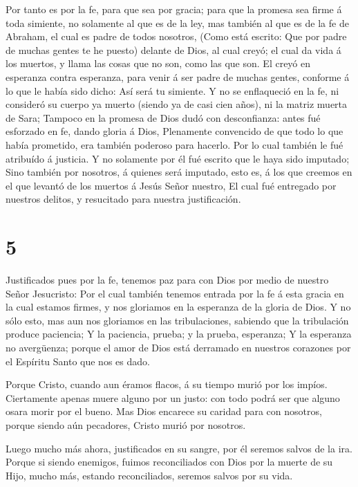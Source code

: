  Por tanto es por la fe, para que sea por gracia; para que
la promesa sea firme á toda simiente, no solamente al que es de la ley,
mas también al que es de la fe de Abraham, el cual es padre de todos
nosotros,  (Como está escrito: Que por padre de muchas
gentes te he puesto) delante de Dios, al cual creyó; el cual da vida á
los muertos, y llama las cosas que no son, como las que son.
 El creyó en esperanza contra esperanza, para venir á ser
padre de muchas gentes, conforme á lo que le había sido dicho: Así será
tu simiente.  Y no se enflaqueció en la fe, ni consideró su
cuerpo ya muerto (siendo ya de casi cien años), ni la matriz muerta de
Sara;  Tampoco en la promesa de Dios dudó con desconfianza:
antes fué esforzado en fe, dando gloria á Dios,  Plenamente
convencido de que todo lo que había prometido, era también poderoso para
hacerlo.  Por lo cual también le fué atribuído á justicia.
 Y no solamente por él fué escrito que le haya sido
imputado;  Sino también por nosotros, á quienes será
imputado, esto es, á los que creemos en el que levantó de los muertos á
Jesús Señor nuestro,  El cual fué entregado por nuestros
delitos, y resucitado para nuestra justificación.

\hypertarget{section-4}{%
\section{5}\label{section-4}}

 Justificados pues por la fe, tenemos paz para con Dios por
medio de nuestro Señor Jesucristo:  Por el cual también
tenemos entrada por la fe á esta gracia en la cual estamos firmes, y nos
gloriamos en la esperanza de la gloria de Dios.  Y no sólo
esto, mas aun nos gloriamos en las tribulaciones, sabiendo que la
tribulación produce paciencia;  Y la paciencia, prueba; y la
prueba, esperanza;  Y la esperanza no avergüenza; porque el
amor de Dios está derramado en nuestros corazones por el Espíritu Santo
que nos es dado.

 Porque Cristo, cuando aun éramos flacos, á su tiempo murió
por los impíos.  Ciertamente apenas muere alguno por un
justo: con todo podrá ser que alguno osara morir por el bueno.
 Mas Dios encarece su caridad para con nosotros, porque
siendo aún pecadores, Cristo murió por nosotros.

 Luego mucho más ahora, justificados en su sangre, por él
seremos salvos de la ira.  Porque si siendo enemigos,
fuimos reconciliados con Dios por la muerte de su Hijo, mucho más,
estando reconciliados, seremos salvos por su vida.

